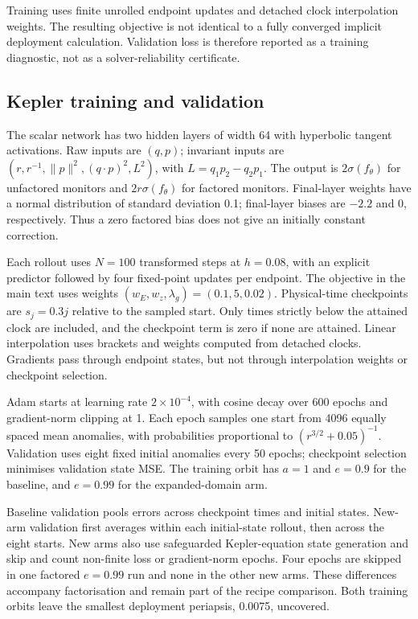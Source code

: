 \documentclass[11pt]{article}
\begin{document}
Training uses finite unrolled endpoint updates and detached clock
interpolation weights. The resulting objective is not identical to a fully
converged implicit deployment calculation. Validation loss is therefore
reported as a training diagnostic, not as a solver-reliability certificate.

\subsection{Kepler training and validation}

The scalar network has two hidden layers of width 64 with hyperbolic
tangent activations. Raw inputs are $(q,p)$; invariant inputs are
$(r,r^{-1},\lVert p\rVert^2,(q\cdot p)^2,L^2)$, with
$L=q_1p_2-q_2p_1$. The output is $2\sigma(f_\theta)$ for unfactored
monitors and $2r\sigma(f_\theta)$ for factored monitors. Final-layer
weights have a normal distribution of standard deviation 0.1; final-layer
biases are $-2.2$ and 0, respectively. Thus a zero factored bias does not
give an initially constant correction.

Each rollout uses $N=100$ transformed steps at $h=0.08$, with an explicit
predictor followed by four fixed-point updates per endpoint. The objective
in the main text uses weights $(w_E,w_z,\lambda_g)=(0.1,5,0.02)$.
Physical-time checkpoints are $s_j=0.3j$ relative to the sampled start.
Only times strictly below the attained clock are included, and the
checkpoint term is zero if none are attained. Linear interpolation uses
brackets and weights computed from detached clocks. Gradients pass through
endpoint states, but not through interpolation weights or checkpoint
selection.

Adam starts at learning rate $2\times10^{-4}$, with cosine decay over
600 epochs and gradient-norm clipping at 1. Each epoch samples one start
from 4096 equally spaced mean anomalies, with probabilities proportional
to $(r^{3/2}+0.05)^{-1}$. Validation uses eight fixed initial anomalies
every 50 epochs; checkpoint selection minimises validation state MSE.
The training orbit has $a=1$ and $e=0.9$ for the baseline, and $e=0.99$
for the expanded-domain arm.

Baseline validation pools errors across checkpoint times and initial
states. New-arm validation first averages within each initial-state
rollout, then across the eight starts. New arms also use safeguarded
Kepler-equation state generation and skip and count non-finite loss or
gradient-norm epochs. Four epochs are skipped in one factored $e=0.99$
run and none in the other new arms. These differences accompany
factorisation and remain part of the recipe comparison. Both training
orbits leave the smallest deployment periapsis, 0.0075, uncovered.
\end{document}

